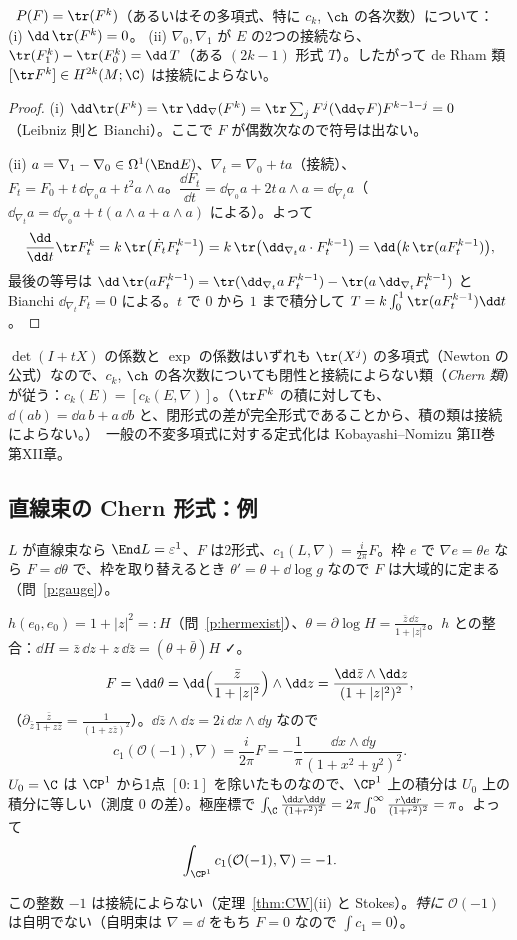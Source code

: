 \begin{thm}\label{thm:CW}\tP\
$P(F)=\tr(F^k)$（あるいはその多項式、特に $c_k$, $\ch$ の各次数）について：
(i) $\dd\,\tr(F^k)=0$。
(ii) $\nabla_0,\nabla_1$ が $E$ の2つの接続なら、$\tr(F_1^k)-\tr(F_0^k)=\dd\,T$（ある $(2k-1)$ 形式 $T$）。したがって de Rham 類 $[\tr F^k]\in H^{2k}(M;\C)$ は接続によらない。
\end{thm}
\begin{proof}
(i) $\dd\tr(F^k)=\tr\,\dd_\nabla(F^k)=\tr\sum_jF^{j}(\dd_\nabla F)F^{k-1-j}=0$（Leibniz 則と Bianchi）。ここで $F$ が偶数次なので符号は出ない。

(ii) $a=\nabla_1-\nabla_0\in\Omega^1(\End E)$、$\nabla_t=\nabla_0+ta$（接続）、$F_t=F_0+t\,\dd_{\nabla_0}a+t^2a\wedge a$。$\dfrac{\dd F_t}{\dd t}=\dd_{\nabla_0}a+2t\,a\wedge a=\dd_{\nabla_t}a$（$\dd_{\nabla_t}a=\dd_{\nabla_0}a+t(a\wedge a+a\wedge a)$ による）。よって
\[
\frac{\dd}{\dd t}\tr F_t^k=k\,\tr\bigl(\dot F_tF_t^{k-1}\bigr)=k\,\tr\bigl(\dd_{\nabla_t}a\cdot F_t^{k-1}\bigr)=\dd\bigl(k\,\tr(aF_t^{k-1})\bigr),
\]
最後の等号は $\dd\,\tr(aF_t^{k-1})=\tr(\dd_{\nabla_t}a\,F_t^{k-1})-\tr(a\,\dd_{\nabla_t}F_t^{k-1})$ と Bianchi $\dd_{\nabla_t}F_t=0$ による。$t$ で $0$ から $1$ まで積分して $T=k\int_0^1\tr(aF_t^{k-1})\dd t$。
\end{proof}
$\det(I+tX)$ の係数と $\exp$ の係数はいずれも $\tr(X^j)$ の多項式（Newton の公式）なので、$c_k$, $\ch$ の各次数についても閉性と接続によらない類（\emph{Chern 類}）が従う：$c_k(E)=[c_k(E,\nabla)]$。（$\tr F^k$ の積に対しても、$\dd(ab)=\dd a\,b+a\,\dd b$ と、閉形式の差が完全形式であることから、積の類は接続によらない。）\tC\ 一般の不変多項式に対する定式化は Kobayashi--Nomizu 第II巻 第XII章。

\subsection{直線束の Chern 形式：例}
$L$ が直線束なら $\End L=\varepsilon^1$、$F$ は2形式、$c_1(L,\nabla)=\frac i{2\pi}F$。枠 $e$ で $\nabla e=\theta e$ なら $F=\dd\theta$ で、枠を取り替えるとき $\theta'=\theta+\dd\log g$ なので $F$ は大域的に定まる（問~\ref{p:gauge}）。

\begin{ex}[$\mathcal O(-1)\to\CP^1$：$\int c_1=-1$]\label{ex:taut}
$h(e_0,e_0)=1+|z|^2=:H$（問~\ref{p:hermexist}）、$\theta=\partial\log H=\frac{\bar z\,\dd z}{1+|z|^2}$。$h$ との整合：$\dd H=\bar z\,\dd z+z\,\dd\bar z=(\theta+\bar\theta)H$ ✓。
\[
F=\dd\theta=\dd\Bigl(\frac{\bar z}{1+|z|^2}\Bigr)\wedge\dd z=\frac{\dd\bar z\wedge\dd z}{(1+|z|^2)^2},
\]
（$\partial_{\bar z}\frac{\bar z}{1+z\bar z}=\frac{1}{(1+z\bar z)^2}$）。$\dd\bar z\wedge\dd z=2i\,\dd x\wedge\dd y$ なので
\[
c_1(\mathcal O(-1),\nabla)=\frac i{2\pi}F=-\frac1\pi\frac{\dd x\wedge\dd y}{(1+x^2+y^2)^2}.
\]
$U_0=\C$ は $\CP^1$ から1点 $[0:1]$ を除いたものなので、$\CP^1$ 上の積分は $U_0$ 上の積分に等しい（測度 $0$ の差）。極座標で $\int_{\C}\frac{\dd x\dd y}{(1+r^2)^2}=2\pi\int_0^\infty\frac{r\dd r}{(1+r^2)^2}=\pi$。よって
\[
\int_{\CP^1}c_1(\mathcal O(-1),\nabla)=-1.
\]
\end{ex}
この整数 $-1$ は接続によらない（定理~\ref{thm:CW}(ii) と Stokes）。\emph{特に} $\mathcal O(-1)$ は自明でない（自明束は $\nabla=\dd$ をもち $F=0$ なので $\int c_1=0$）。


